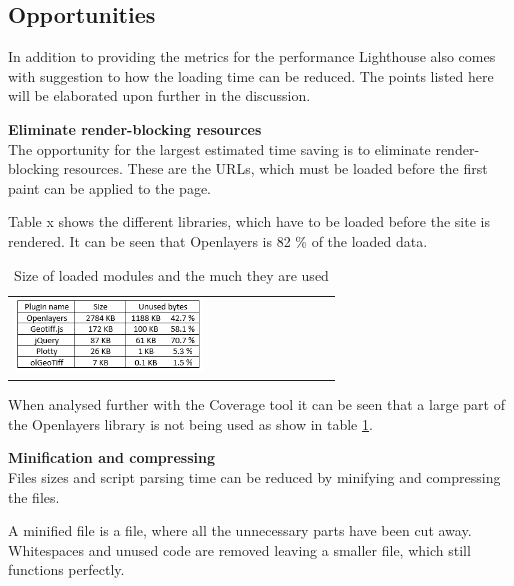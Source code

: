 \subsection{Opportunities}
In addition to providing the metrics for the performance Lighthouse also comes with suggestion to how the loading time can be reduced. The points listed here will be elaborated upon further in the discussion.

\textbf{Eliminate render-blocking resources}\\
The opportunity for the largest estimated time saving is to eliminate render-blocking resources. These are the URLs, which must be loaded before the first paint can be applied to the page. \citep{RenderBlocking}

Table x shows the different libraries, which have to be loaded before the site is rendered. It can be seen that Openlayers is 82 \% of the loaded data.


\begin{table}[htbp]
	\centering
	\begin{tabular}{l}
		\includegraphics[width=0.6\textwidth]{Pictures/tabPluginSize}
	\end{tabular}
	\caption{Size of loaded modules and the much they are used}
	\label{tabPluginSize}
\end{table}

When analysed further with the Coverage tool it can be seen that a large part of the Openlayers library is not being used as show in table \ref{tabPluginSize}.  


\textbf{Minification and compressing}\\
Files sizes and script parsing time can be reduced by minifying and compressing the files. 

A minified file is a file, where all the unnecessary parts have been cut away. Whitespaces and unused code are removed leaving a smaller file, which still functions perfectly. 

